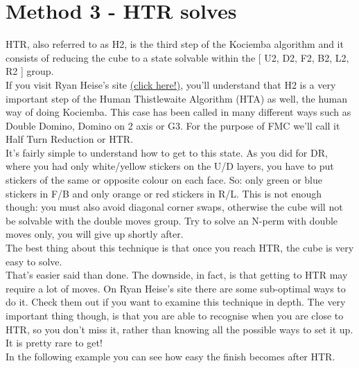 \documentclass[11pt,a4paper]{book}
\begin{document}
\section{Method 3 - HTR solves}
HTR, also referred to as H2, is the third step of the Kociemba algorithm and it consists of reducing the cube to a state solvable within the [ U2, D2, F2, B2, L2, R2 ] group. \\
\newline
If you visit Ryan Heise’s site \href{ https://www.ryanheise.com/cube/human\_thistlethwaite\_algorithm.html}{(click here!)}, you’ll understand that H2 is a very important step of the Human Thistlewaite Algorithm (HTA) as well, the human way of doing Kociemba. This case has been called in many different ways such as Double Domino, Domino on 2 axis or G3. For the purpose of FMC we’ll call it Half Turn Reduction or HTR.\\
It’s fairly simple to understand how to get to this state. As you did for DR, where you had only white/yellow stickers on the U/D layers, you have to put stickers of the same or opposite colour on each face. So: only green or blue stickers in F/B and only orange or red stickers in R/L. 
This is not enough though: you must also avoid diagonal corner swaps, otherwise the cube will not be solvable with the double moves group. Try to solve an N-perm with double moves only, you will give up shortly after.\\
The best thing about this technique is that once you reach HTR, the cube is very easy to solve.\\
\newline
That’s easier said than done. The downside, in fact, is that getting to HTR may require a lot of moves. On Ryan Heise's site there are some sub-optimal ways to do it. Check them out if you want to examine this technique in depth. The very important thing though, is that you are able to recognise when you are close to HTR, so you don’t miss it, rather than knowing all the possible ways to set it up. It is pretty rare to get!\\
In the following example you can see how easy the finish becomes after HTR.\\
\end{document}
